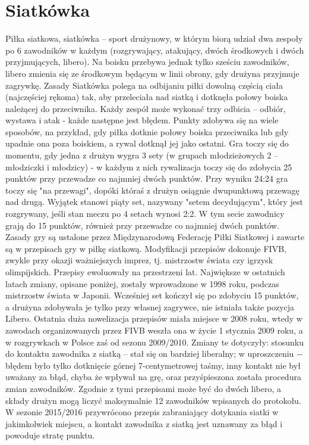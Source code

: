 \documentclass[14pt,oneside,a4paper]{book}
\theoremstyle{break}
\begin{document}
\chapter {Siatkówka}

Piłka siatkowa, siatkówka – sport drużynowy, w którym biorą udział dwa zespoły po 6 zawodników w każdym (rozgrywający, atakujący, dwóch środkowych i dwóch przyjmujących, libero). Na boisku przebywa jednak tylko sześciu zawodników, libero zmienia się ze środkowym będącym w linii obrony, gdy drużyna przyjmuje zagrywkę.
Zasady
	Siatkówka polega na odbijaniu piłki dowolną częścią ciała (najczęściej rękoma) tak, aby przeleciała nad siatką i dotknęła połowy boiska należącej do przeciwnika. Każdy zespół może wykonać trzy odbicia – odbiór, wystawa i atak - każde następne jest błędem. Punkty zdobywa się na wiele sposobów, na przykład, gdy piłka dotknie połowy boiska przeciwnika lub gdy upadnie ona poza boiskiem, a rywal dotknął jej jako ostatni. Gra toczy się do momentu, gdy jedna z drużyn wygra 3 sety (w grupach młodzieżowych 2 – młodziczki i młodzicy) - w każdym z nich rywalizacja toczy się do zdobycia 25 punktów przy przewadze co najmniej dwóch punktów. Przy wyniku 24:24 gra toczy się "na przewagi", dopóki któraś z drużyn osiągnie dwupunktową przewagę nad drugą. Wyjątek stanowi piąty set, nazywany "setem decydującym", który jest rozgrywany, jeśli stan meczu po 4 setach wynosi 2:2. W tym secie zawodnicy grają do 15 punktów, również przy przewadze co najmniej dwóch punktów.
Zasady gry są ustalone przez Międzynarodową Federację Piłki Siatkowej i zawarte są w przepisach gry w piłkę siatkową. Modyfikacji przepisów dokonuje FIVB, zwykle przy okazji ważniejszych imprez, tj. mistrzostw świata czy igrzysk olimpijskich. Przepisy ewoluowały na przestrzeni lat. Największe w ostatnich latach zmiany, opisane poniżej, zostały wprowadzone w 1998 roku, podczas mistrzostw świata w Japonii. Wcześniej set kończył się po zdobyciu 15 punktów, a drużyna zdobywała je tylko przy własnej zagrywce, nie istniała także pozycja Libero. Ostatnia duża nowelizacja przepisów miała miejsce w 2008 roku, wtedy w zawodach organizowanych przez FIVB weszła ona w życie 1 stycznia 2009 roku, a w rozgrywkach w Polsce zaś od sezonu 2009/2010. Zmiany te dotyczyły: stosunku do kontaktu zawodnika z siatką – stał się on bardziej liberalny; w uproszczeniu − błędem było tylko dotknięcie górnej 7-centymetrowej taśmy, inny kontakt nie był uważany za błąd, chyba że wpływał na grę, oraz przyśpieszona została procedura zmian zawodników. Zgodnie z tymi przepisami może być do dwóch libero, a składy drużyn mogą liczyć maksymalnie 12 zawodników wpisanych do protokołu. W sezonie 2015/2016 przywrócono przepis zabraniający dotykania siatki w jakimkolwiek miejscu, a kontakt zawodnika z siatką jest uznawany za błąd i powoduje stratę punktu.
\end{document}
